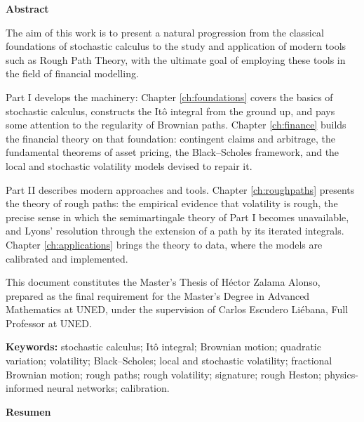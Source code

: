 \thispagestyle{empty}

{\Huge \textbf{Abstract}}

\vspace{0.2cm}

The aim of this work is to present a natural progression from the classical foundations of stochastic calculus to the study and application of modern tools such as Rough Path Theory, with the ultimate goal of employing these tools in the field of financial modelling. 


Part I develops the machinery: Chapter \ref{ch:foundations} covers the basics of stochastic calculus, constructs
the Itô integral from the ground up, and pays some attention to the regularity of Brownian
paths. Chapter \ref{ch:finance} builds the financial theory on that foundation:
contingent claims and arbitrage, the fundamental theorems of asset pricing, the Black--Scholes
framework, and the local and stochastic volatility models devised to repair it.

Part II describes modern approaches and tools. Chapter \ref{ch:roughpaths}
presents the theory of rough paths: the empirical evidence that volatility is rough, the precise
sense in which the semimartingale theory of Part I becomes unavailable, and Lyons' resolution through the extension of a path by its
iterated integrals. Chapter \ref{ch:applications} brings the theory to data, where the models are calibrated and
implemented.


This document constitutes the Master’s Thesis of Héctor Zalama Alonso, prepared as the final requirement for the Master’s Degree in Advanced Mathematics at UNED, under the supervision of Carlos Escudero Liébana, Full Professor at UNED.



\noindent\textbf{Keywords:} stochastic calculus; Itô integral; Brownian motion; quadratic
variation; volatility; Black--Scholes; local and stochastic volatility; fractional Brownian motion;
rough paths; rough volatility; signature; rough Heston; physics-informed neural networks;
calibration.

\vspace{0.6cm}

{\Huge \textbf{Resumen}}

